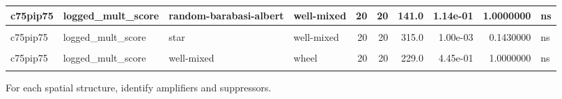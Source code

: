 \documentclass[
]{book}
\begin{document}
\begin{table}
\begin{tabular}{l|l|l|l|r|r|r|r|r|l}
\hline
c75pip75 & logged\_mult\_score & random-barabasi-albert & well-mixed & 20 & 20 & 141.0 & 1.14e-01 & 1.0000000 & ns\\
\hline
\cellcolor{gray!6}{c75pip75} & \cellcolor{gray!6}{logged\_mult\_score} & \cellcolor{gray!6}{random-waxman} & \cellcolor{gray!6}{well-mixed} & \cellcolor{gray!6}{20} & \cellcolor{gray!6}{20} & \cellcolor{gray!6}{129.0} & \cellcolor{gray!6}{5.60e-02} & \cellcolor{gray!6}{1.0000000} & \cellcolor{gray!6}{ns}\\
\hline
c75pip75 & logged\_mult\_score & star & well-mixed & 20 & 20 & 315.0 & 1.00e-03 & 0.1430000 & ns\\
\hline
\cellcolor{gray!6}{c75pip75} & \cellcolor{gray!6}{logged\_mult\_score} & \cellcolor{gray!6}{toroidal-lattice} & \cellcolor{gray!6}{well-mixed} & \cellcolor{gray!6}{20} & \cellcolor{gray!6}{20} & \cellcolor{gray!6}{117.0} & \cellcolor{gray!6}{2.40e-02} & \cellcolor{gray!6}{1.0000000} & \cellcolor{gray!6}{ns}\\
\hline
c75pip75 & logged\_mult\_score & well-mixed & wheel & 20 & 20 & 229.0 & 4.45e-01 & 1.0000000 & ns\\
\hline
\cellcolor{gray!6}{c75pip75} & \cellcolor{gray!6}{logged\_mult\_score} & \cellcolor{gray!6}{well-mixed} & \cellcolor{gray!6}{windmill} & \cellcolor{gray!6}{20} & \cellcolor{gray!6}{20} & \cellcolor{gray!6}{256.0} & \cellcolor{gray!6}{1.34e-01} & \cellcolor{gray!6}{1.0000000} & \cellcolor{gray!6}{ns}\\
\hline
\end{tabular}
\end{table}

For each spatial structure, identify amplifiers and suppressors.
\end{document}
